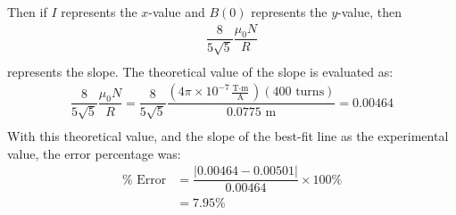 \documentclass [12pt, letterpaper, twoside] {article}
\begin{document}
\begin{enumerate}
\begin{enumerate}
        Then if \(I\) represents the \(x\)-value and \(B(0)\) represents the \(y\)-value, then
        \begin{equation*}
          \begin{split}
            \dfrac{8}{5\sqrt{5}}\dfrac{\mu_{0}N}{R} \\
          \end{split}
        \end{equation*}
        represents the slope.
        The theoretical value of the slope is evaluated as:
        \begin{equation*}
          \begin{split}
            \dfrac{8}{5\sqrt{5}}\dfrac{\mu_{0}N}{R} = \dfrac{8}{5\sqrt{5}}\dfrac{(4\pi\times{10}^{-7}\tfrac{\text{T}\cdot\text{m}}{\text{A}})(400\text{ turns})}{0.0775\text{ m}} = 0.00464 \\ %
          \end{split}
        \end{equation*}
        With this theoretical value, and the slope of the best-fit line as the experimental value, the error percentage was:
        \begin{equation*}
          \begin{split}
            \%\text{ Error} &= \dfrac{|0.00464 - 0.00501|}{0.00464}\times{100\%} \\
                            &= 7.95 \% \\ %
          \end{split}
        \end{equation*}
    \end{enumerate}
\end{enumerate}
\end{document}

